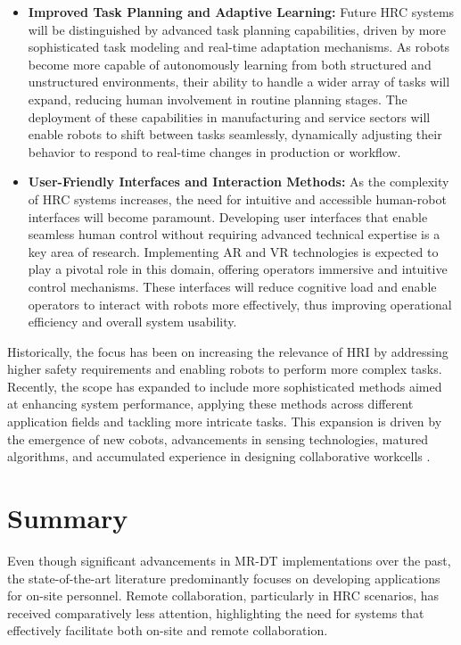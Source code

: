 \begin{itemize}
    \item \textbf{Improved Task Planning and Adaptive Learning:} Future \ac{HRC} systems will be distinguished by advanced task planning capabilities, driven by more sophisticated task modeling and real-time adaptation mechanisms. As robots become more capable of autonomously learning from both structured and unstructured environments, their ability to handle a wider array of tasks will expand, reducing human involvement in routine planning stages. The deployment of these capabilities in manufacturing and service sectors will enable robots to shift between tasks seamlessly, dynamically adjusting their behavior to respond to real-time changes in production or workflow.

    \item \textbf{User-Friendly Interfaces and Interaction Methods:} As the complexity of \ac{HRC} systems increases, the need for intuitive and accessible human-robot interfaces will become paramount. Developing user interfaces that enable seamless human control without requiring advanced technical expertise is a key area of research. Implementing \ac{AR} and \ac{VR} technologies is expected to play a pivotal role in this domain, offering operators immersive and intuitive control mechanisms. These interfaces will reduce cognitive load and enable operators to interact with robots more effectively, thus improving operational efficiency and overall system usability.
\end{itemize}


Historically, the focus has been on increasing the relevance of \ac{HRI} by addressing higher safety requirements and enabling 
robots to perform more complex tasks. Recently, the scope has expanded to include more sophisticated methods aimed at enhancing system performance, 
applying these methods across different application fields and tackling more intricate tasks. This expansion is driven by the emergence of new 
cobots, advancements in sensing technologies, matured algorithms, and accumulated experience in designing collaborative workcells \cite{robotics8040100}.

\section{Summary}

Even though significant advancements in \ac{MR}-\ac{DT} implementations over the past, the state-of-the-art literature predominantly focuses on developing applications for on-site personnel. Remote collaboration, particularly in \ac{HRC} scenarios, has received comparatively less attention, highlighting the need for systems that effectively facilitate both on-site and remote collaboration.

